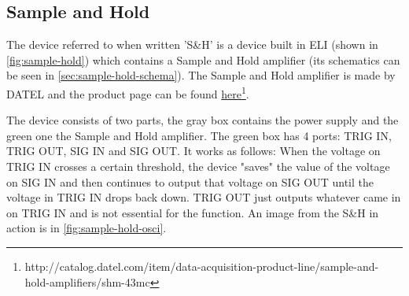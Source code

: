 \documentclass[a4paper, 10pt]{article}
\begin{document}
\subsection{Sample and Hold}\label{subsec:sample-hold}
The device referred to when written 'S\&H' is a device built in ELI (shown in \cref{fig:sample-hold}) which contains a Sample and Hold amplifier (its schematics can be seen in \cref{sec:sample-hold-schema}).
The Sample and Hold amplifier is made by DATEL and the product page can be found \href{http://catalog.datel.com/item/data-acquisition-product-line/sample-and-hold-amplifiers/shm-43mc}{here}\footnote{http://catalog.datel.com/item/data-acquisition-product-line/sample-and-hold-amplifiers/shm-43mc}.

The device consists of two parts, the gray box contains the power supply and the green one the Sample and Hold amplifier.
The green box has 4 ports: TRIG IN, TRIG OUT, SIG IN and SIG OUT.
It works as follows: When the voltage on TRIG IN crosses a certain threshold, the device "saves" the value of the voltage on SIG IN and then continues to output that voltage on SIG OUT until the voltage in TRIG IN drops back down.
TRIG OUT just outputs whatever came in on TRIG IN and is not essential for the function.
An image from the S\&H in action is in \cref{fig:sample-hold-osci}.
\end{document}
